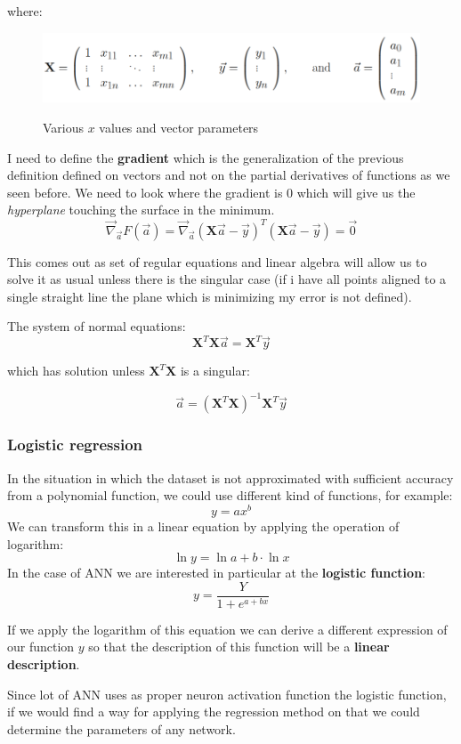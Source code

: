 \documentclass{article}
\begin{document}
where:
\begin{figure}[H]
    \centering
    \includegraphics[scale=0.5]{images/parameters_multilinear_regre.png}
    \label{fig:infos_multilinear}
    \caption{Various $x$ values and vector parameters}
\end{figure}
I need to define the \textbf{gradient} which is the generalization of the previous definition
defined on vectors and not on the partial derivatives of functions as we seen before.
We need to look where the gradient is $0$ which will give us the \textit{hyperplane}
touching the surface in the minimum.
$$\vec{\nabla}_{\vec{a}} F(\vec{a})=\vec{\nabla}_{\vec{a}}(\textbf{X}\vec{a}-\vec{y})^T(\textbf{X}\vec{a}-\vec{y})=\vec{0}$$

This comes out as set of regular equations and linear algebra will allow us to solve it as
usual unless there is the singular case (if i have all points aligned to a single straight line
the plane which is minimizing my error is not defined).

The system of normal equations:
$$\textbf{X}^T\textbf{X}\vec{a}=\textbf{X}^T\vec{y}$$

which has solution unless $\textbf{X}^T\textbf{X}$ is a singular:

$$\vec{a}=(\textbf{X}^T\textbf{X})^{-1}\textbf{X}^T\vec{y}$$

\subsubsection{Logistic regression}
In the situation in which the dataset is not approximated with sufficient accuracy
from a polynomial function, we could use different kind of functions, for example:
$$y=ax^b$$
We can transform this in a linear equation by applying the operation of logarithm:
$$\ln{y}=\ln{a}+b\cdot\ln{x}$$
In the case of ANN we are interested in particular at the \textbf{logistic function}:
$$y=\frac{Y}{1 + e^{a+bx}}$$

If we apply the logarithm of this equation we can derive a different expression of our
function $y$ so that the description of this function will be a \textbf{linear description}.

Since lot of ANN uses as proper neuron activation function the logistic function,
if we would find a way for applying the regression method on that we could determine
the parameters of any network.
\end{document}
